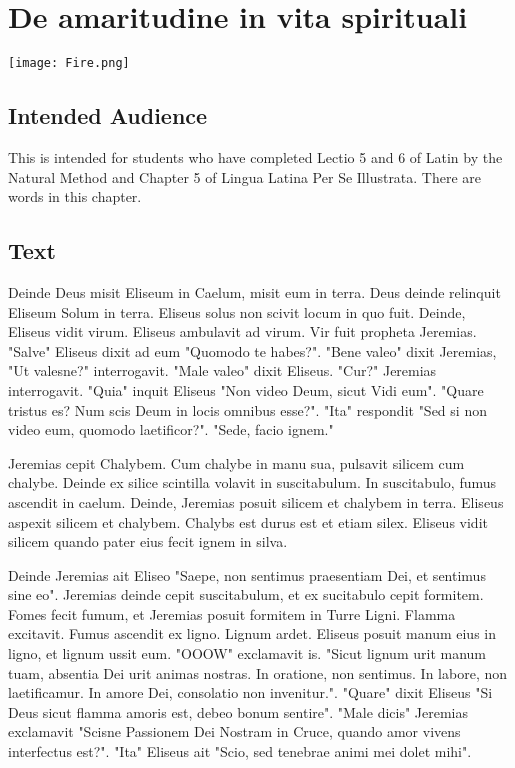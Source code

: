 \chapter{De amaritudine in vita spirituali}
\begin{center}
\texttt{[image: Fire.png]}
\end{center}

\section{Intended Audience}
This is intended for students who have completed Lectio 5 and 6 of Latin by the Natural Method and Chapter 5 of Lingua Latina Per Se Illustrata. There are words in this chapter.

\section{Text}
Deinde Deus misit Eliseum in Caelum, misit eum in terra. Deus deinde relinquit Eliseum Solum in terra. Eliseus solus non scivit locum in quo fuit. Deinde, Eliseus vidit virum. Eliseus ambulavit ad virum. Vir fuit propheta Jeremias. "Salve" Eliseus dixit ad eum "Quomodo te habes?". "Bene valeo" dixit Jeremias, "Ut valesne?" interrogavit. "Male valeo" dixit Eliseus. "Cur?" Jeremias interrogavit. "Quia" inquit Eliseus "Non video Deum, sicut Vidi eum". "Quare tristus es? Num scis Deum in locis omnibus esse?". "Ita" respondit "Sed si non video eum, quomodo laetificor?". "Sede, facio ignem." \par 
Jeremias cepit Chalybem. Cum chalybe in manu sua, pulsavit silicem cum chalybe. Deinde ex silice scintilla volavit in suscitabulum. In suscitabulo, fumus ascendit in caelum. Deinde, Jeremias posuit silicem et chalybem in terra. Eliseus aspexit silicem et chalybem. Chalybs est durus est et etiam silex. Eliseus vidit silicem quando pater eius fecit ignem in silva. \par
Deinde Jeremias ait Eliseo "Saepe, non sentimus praesentiam Dei, et sentimus sine eo". Jeremias deinde cepit suscitabulum, et ex sucitabulo cepit formitem. Fomes fecit fumum, et Jeremias posuit formitem in Turre Ligni. Flamma excitavit. Fumus ascendit ex ligno. Lignum ardet. Eliseus posuit manum eius in ligno, et lignum ussit eum. "OOOW" exclamavit is. "Sicut lignum urit manum tuam, absentia Dei urit animas nostras. In oratione, non sentimus. In labore, non laetificamur. In amore Dei, consolatio non invenitur.". "Quare" dixit Eliseus "Si Deus sicut flamma amoris est, debeo bonum sentire". "Male dicis" Jeremias exclamavit "Scisne Passionem Dei Nostram in Cruce, quando amor vivens interfectus est?". "Ita" Eliseus ait "Scio, sed tenebrae animi mei dolet mihi". \par
